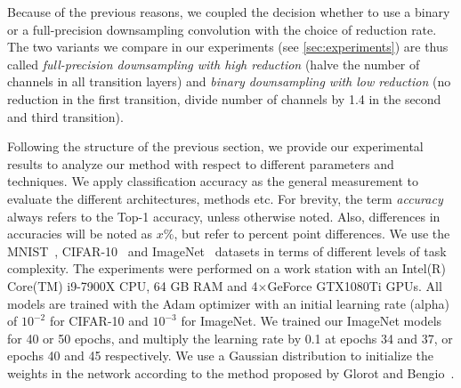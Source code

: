 \documentclass[10pt,twocolumn,letterpaper]{article}
\begin{document}
Because of the previous reasons, we coupled the decision whether to use a binary or a full-precision downsampling convolution with the choice of reduction rate.
The two variants we compare in our experiments (see \autoref{sec:experiments}) are thus called \emph{full-precision downsampling with high reduction} (halve the number of channels in all transition layers) and \emph{binary downsampling with low reduction} (no reduction in the first transition, divide number of channels by 1.4 in the second and third transition).


Following the structure of the previous section, we provide our experimental results to analyze our method with respect to different parameters and techniques.
We apply classification accuracy as the general measurement to evaluate the different architectures, methods etc.
For brevity, the term \emph{accuracy} always refers to the Top-1 accuracy, unless otherwise noted.
Also, differences in accuracies will be noted as $x$\%, but refer to percent point differences.
We use the MNIST~\cite{lecun-mnisthandwrittendigit-2010}, CIFAR-10~\cite{cifar10} and ImageNet~\cite{imagenet_cvpr09} datasets in terms of different levels of task complexity.
The experiments were performed on a work station with an Intel(R) Core(TM) i9-7900X CPU, 64 GB RAM and 4$\times$GeForce GTX1080Ti GPUs.
All models are trained with the Adam optimizer \cite{kingma2014adam} with an initial learning rate (alpha) of $10^{-2}$ for CIFAR-10 and $10^{-3}$ for ImageNet.
We trained our ImageNet models for 40 or 50 epochs, and multiply the learning rate by 0.1 at epochs 34 and 37, or epochs 40 and 45 respectively.
We use a Gaussian distribution to initialize the weights in the network according to the method proposed by Glorot and Bengio~\cite{glorot2010understanding}.
\end{document}
